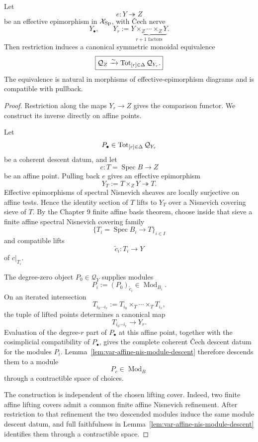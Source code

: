 \begin{proposition}
\label{prop:var-linear-coefficient-effective-descent}
Let
\[
    e:Y\twoheadrightarrow Z
\]
be an effective epimorphism in \(\mathcal{X}_{\mathrm{Sp}}\), with \v{C}ech nerve
\[
    Y_\bullet,\qquad
    Y_r:=\underbrace{Y\times_Z\cdots\times_ZY}_{r+1\text{ factors}}.
\]
Then restriction induces a canonical symmetric monoidal equivalence
\[
    \boxed{
    \mathcal Q_Z
    \xrightarrow{\sim}
    \operatorname{Tot}_{[r]\in\Delta}\mathcal Q_{Y_r}.
    }
\]
The equivalence is natural in morphisms of effective-epimorphism diagrams and is compatible with pullback.
\end{proposition}

\begin{proof}
Restriction along the maps \(Y_r\to Z\) gives the comparison functor.  We construct its inverse directly on affine points.

Let
\[
    P_\bullet
    \in
    \operatorname{Tot}_{[r]\in\Delta}\mathcal Q_{Y_r}
\]
be a coherent descent datum, and let
\[
    c:T=\operatorname{Spec}B\longrightarrow Z
\]
be an affine point.  Pulling back \(e\) gives an effective epimorphism
\[
    Y_T:=T\times_ZY\twoheadrightarrow T.
\]
Effective epimorphisms of spectral Nisnevich sheaves are locally surjective on affine tests.  Hence the identity section of \(T\) lifts to \(Y_T\) over a Nisnevich covering sieve of \(T\).  By the Chapter 9 finite affine basis theorem, choose inside that sieve a finite affine spectral Nisnevich covering family
\[
    \{T_i=\operatorname{Spec}B_i\longrightarrow T\}_{i\in I}
\]
and compatible lifts
\[
    \widetilde c_i:T_i\longrightarrow Y
\]
of \(c|_{T_i}\).

The degree-zero object \(P_0\in\mathcal Q_Y\) supplies modules
\[
    P_i:=(P_0)_{\widetilde c_i}\in\operatorname{Mod}_{B_i}.
\]
On an iterated intersection
\[
    T_{i_0\cdots i_r}
    :=
    T_{i_0}\times_T\cdots\times_TT_{i_r},
\]
the tuple of lifted points determines a canonical map
\[
    T_{i_0\cdots i_r}
    \longrightarrow
    Y_r.
\]
Evaluation of the degree-\(r\) part of \(P_\bullet\) at this affine point, together with the cosimplicial compatibility of \(P_\bullet\), gives the complete coherent \v{C}ech descent datum for the modules \(P_i\).  Lemma~\ref{lem:var-affine-nis-module-descent} therefore descends them to a module
\[
    P_c\in\operatorname{Mod}_B
\]
through a contractible space of choices.

The construction is independent of the chosen lifting cover.  Indeed, two finite affine lifting covers admit a common finite affine Nisnevich refinement.  After restriction to that refinement the two descended modules induce the same module descent datum, and full faithfulness in Lemma~\ref{lem:var-affine-nis-module-descent} identifies them through a contractible space.


\end{proof}

